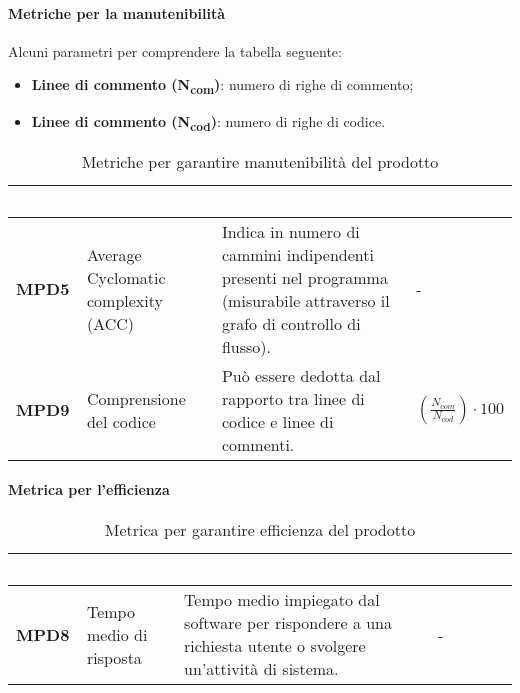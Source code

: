 \paragraph{Metriche per la manutenibilità}
Alcuni parametri per comprendere la tabella seguente:
\begin{itemize}
	\item \textbf{Linee di commento (N\textsubscript{com})}: numero di righe di commento;
	\item \textbf{Linee di commento (N\textsubscript{cod})}: numero di righe di codice.
\end{itemize}
\renewcommand{\arraystretch}{1.5}
\renewcommand\extrarowheight{1.5pt}
\begin{longtable}{C{1.5cm} C{4.5cm} C{5.5cm} C{5cm}}
		\textcolor{white}{\textbf{Codice}} & 
		\textcolor{white}{\textbf{Nome}} & 
		\textcolor{white}{\textbf{Descrizione}} & 
		\textcolor{white}{\textbf{Formula}} \\
		\endfirsthead
	    \endfoot
	    \caption{Metriche per garantire manutenibilità del prodotto}
	    \endlastfoot
		\hline
		\textbf{MPD5} & 
		Average Cyclomatic complexity (ACC) & 
		Indica in numero di cammini indipendenti presenti nel programma (misurabile attraverso il grafo di controllo di flusso). & -\\
		\textbf{MPD9} & 
		Comprensione del codice & 
		Può essere dedotta dal rapporto tra linee di codice e linee di commenti. &
		$(\frac{N_{com}}{N_{cod}}) \cdot 100 $ \\
		
\end{longtable}
\paragraph{Metrica per l'efficienza}
\renewcommand{\arraystretch}{1.5}
\renewcommand\extrarowheight{1.5pt}
\begin{longtable}{C{1.5cm} C{4.5cm} C{5.5cm} C{5cm}}
		\textcolor{white}{\textbf{Codice}} & 
		\textcolor{white}{\textbf{Nome}} & 
		\textcolor{white}{\textbf{Descrizione}} & 
		\textcolor{white}{\textbf{Formula}} \\
		\endfirsthead
	    \endfoot
	    \caption{Metrica per garantire efficienza del prodotto}
	    \endlastfoot
		\hline
		\textbf{MPD8} & 
		Tempo medio di risposta & 
		Tempo medio impiegato dal software per rispondere a una richiesta utente o svolgere un'attività di sistema. &
		- \\
\end{longtable}		
